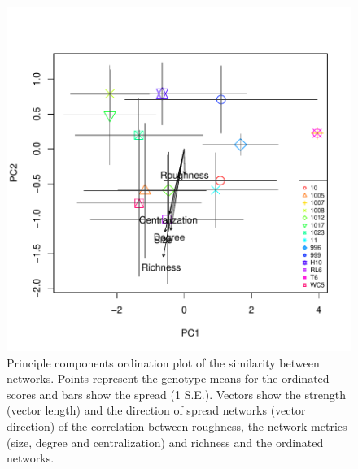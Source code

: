 \documentclass[11pt]{amsart}
\begin{document}
\begin{figure} 
\begin{center} 
\includegraphics{ONC_Lichen_Summary-ordinet}
\end{center} 
\caption{Principle components ordination plot of the similarity
  between networks. Points represent the genotype means for the
  ordinated scores and bars show the spread (1 S.E.). Vectors show the
strength (vector length) and the direction of spread networks (vector
direction) of the correlation between roughness, the network metrics
(size, degree and centralization) and richness and the ordinated
networks.}
\label{fig:two}
\end{figure}
\end{document}
